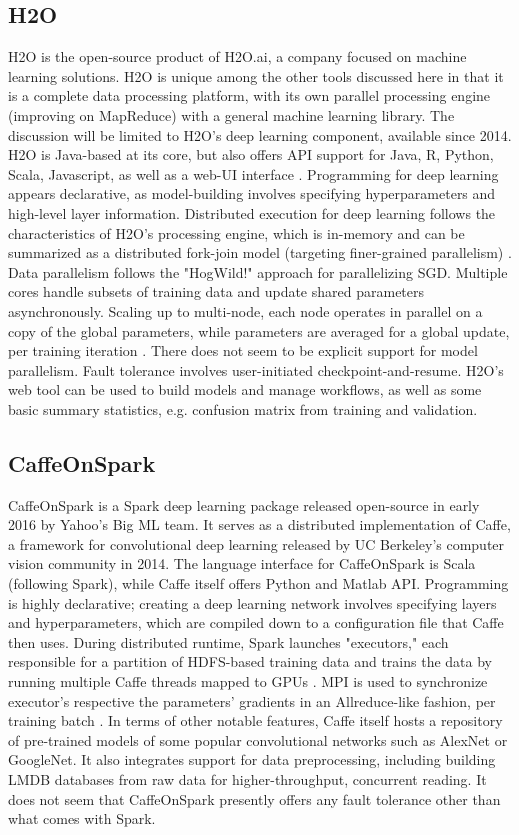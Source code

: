 \documentclass{article}
\begin{document}
\subsection{H2O}
H2O is the open-source product of H2O.ai, a company focused on machine learning solutions. H2O is unique among the other tools discussed here in that it is a complete data processing platform, with its own parallel processing engine (improving on MapReduce) with a general machine learning library. The discussion will be limited to H2O's deep learning component, available since 2014. H2O is Java-based at its core, but also offers API support for Java, R, Python, Scala, Javascript, as well as a web-UI interface \cite{candel2015deep}. Programming for deep learning appears declarative, as model-building involves specifying hyperparameters and high-level layer information. Distributed execution for deep learning follows the characteristics of H2O's processing engine, which is in-memory and can be summarized as a distributed fork-join model (targeting finer-grained parallelism) \cite{Landset2015}. Data parallelism follows the "HogWild!" \cite{recht2011hogwild} approach for parallelizing SGD. Multiple cores handle subsets of training data and update shared parameters asynchronously. Scaling up to multi-node, each node operates in parallel on a copy of the global parameters, while parameters are averaged for a global update, per training iteration \cite{candel2015deep}. There does not seem to be explicit support for model parallelism. Fault tolerance involves user-initiated checkpoint-and-resume. H2O's web tool can be used to build models and manage workflows, as well as some basic summary statistics, e.g. confusion matrix from training and validation. 

\subsection{CaffeOnSpark}
CaffeOnSpark is a Spark deep learning package released open-source in early 2016 by Yahoo's Big ML team. It serves as a distributed implementation of Caffe, a framework for convolutional deep learning released by UC Berkeley's computer vision community in 2014. The language interface for CaffeOnSpark is Scala (following Spark), while Caffe itself offers Python and Matlab API. Programming is highly declarative; creating a deep learning network involves specifying layers and hyperparameters, which are compiled down to a configuration file that Caffe then uses. During distributed runtime, Spark launches "executors," each responsible for a partition of HDFS-based training data and trains the data by running multiple Caffe threads mapped to GPUs \cite{Large52:online}. MPI is used to synchronize executor's respective the parameters' gradients in an Allreduce-like fashion, per training batch \cite{Caffe27:online}. In terms of other notable features, Caffe itself hosts a repository of pre-trained models of some popular convolutional networks such as AlexNet or GoogleNet. It also integrates support for data preprocessing, including building LMDB databases from raw data for higher-throughput, concurrent reading. It does not seem that CaffeOnSpark presently offers any fault tolerance other than what comes with Spark.
\end{document}
